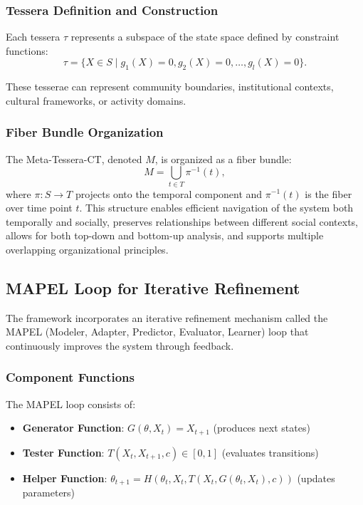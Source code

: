 \documentclass[11pt,a4paper]{article}
\begin{document}
\subsubsection{Tessera Definition and Construction}

Each tessera $\tau$ represents a subspace of the state space defined by constraint functions:
\begin{equation}
\tau = \{X \in S \mid g_1(X) = 0, g_2(X) = 0, \ldots, g_l(X) = 0\}.
\end{equation}

These tesserae can represent community boundaries, institutional contexts, cultural frameworks, or activity domains.

\subsubsection{Fiber Bundle Organization}

The Meta-Tessera-CT, denoted $M$, is organized as a fiber bundle:
\begin{equation}
M = \bigcup_{t \in T} \pi^{-1}(t),
\end{equation}
where $\pi : S \to T$ projects onto the temporal component and $\pi^{-1}(t)$ is the fiber over time point $t$. This structure enables efficient navigation of the system both temporally and socially, preserves relationships between different social contexts, allows for both top-down and bottom-up analysis, and supports multiple overlapping organizational principles.

\subsection{MAPEL Loop for Iterative Refinement}

The framework incorporates an iterative refinement mechanism called the MAPEL (Modeler, Adapter, Predictor, Evaluator, Learner) loop that continuously improves the system through feedback.

\subsubsection{Component Functions}

The MAPEL loop consists of:
\begin{itemize}
\item \textbf{Generator Function}: $G(\theta, X_t) = X_{t+1}$ (produces next states)
\item \textbf{Tester Function}: $T(X_t, X_{t+1}, c) \in [0, 1]$ (evaluates transitions)
\item \textbf{Helper Function}: $\theta_{t+1} = H(\theta_t, X_t, T(X_t, G(\theta_t, X_t), c))$ (updates parameters)
\end{itemize}
\end{document}
